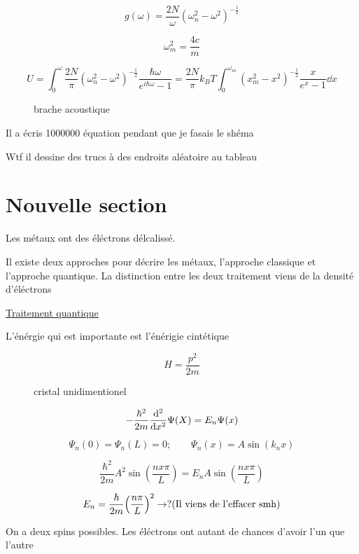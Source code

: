 



$$g(\omega) = \frac{2N}{\omega} (\omega_{n}^2-\omega^2)^{-\frac{1}{2}}$$ 

$$\omega_{m}^2 = \frac{4c}{m} $$ 


$$U = \int_{0}^\omega \frac{2N}{\pi} (\omega_{n}^2 - \omega^2)^{- \frac{1}{2}} \frac{\hbar\omega}{e^{i\hbar\omega}-1} = \frac{2N}{\pi} k_{B}T\int_{0}^{\omega_{m}} (x^2_m-x^2)^{- \frac{1}{2}} \frac{x}{e^x-1} \dd x$$ 

\begin{figure}[ht]
    \centering
    \caption{brache acoustique}
    \label{fig:brache-acoustique}
\end{figure}

Il a écris 1000000 équation pendant que je fasais le shéma

Wtf il dessine des trucs à des endroits aléatoire au tableau

\section*{Nouvelle section}

Les métaux ont des éléctrons délcalissé. 

Il existe deux approches pour décrire les métaux, l'approche classique et l'approche quantique. La distinction entre les deux traitement viens de la densité d'éléctrons



\underline{Traitement quantique} 

L'énérgie qui est importante est l'énérigie cintétique

$$H = \frac{p^2}{2m} $$ 


\begin{figure}[ht]
    \centering
    \caption{cristal unidimentionel}
    \label{fig:cristal-unidimentionel}
\end{figure}


$$- \frac{\hbar^2}{2m} \dv[2]{x}\Psi(X) = E_{n}\Psi(x)$$ 

$$\boxed{\Psi_{n}(0)=\Psi_{n}(L) = 0;\qquad \Psi_{n}(x) = A\sin(k_nx)}$$ 

$$ \frac{\hbar^2}{2m} A^2 \sin(\frac{nx\pi}{L}) = E_{n}A \sin( \frac{nx\pi}{L})$$ 

$$E_{n}= \frac{\hbar}{2m} \qty(\frac{n\pi}{L} )^2 \to ? \text{(Il viens de l'effacer smh)}$$ 

On a deux spins possibles. Les éléctrons ont autant de chances d'avoir l'un que l'autre

